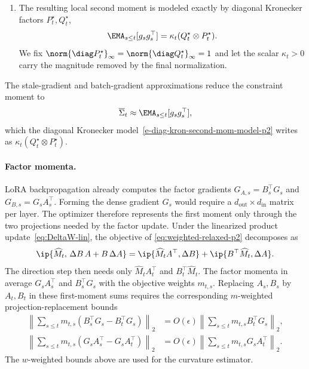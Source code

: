\begin{enumerate}[leftmargin=1.6em,itemsep=2pt,topsep=2pt]
  ; it measures the whole quadratic-form
  change, including the cross terms created by changing the factors.
  \item The resulting local second moment is modeled exactly by diagonal
  Kronecker factors $P^\star_t,Q^\star_t$,
  \begin{equation}\label{e-diag-kron-second-mom-model-p2}
    \EMA_{s\le t}[g_sg_s^\top]
    =
    \kappa_t(Q^\star_t\otimes P^\star_t).
  \end{equation}
  We fix $\norm{\diag P^\star_t}_\infty=\norm{\diag Q^\star_t}_\infty=1$ and
  let the scalar $\kappa_t>0$ carry the magnitude removed by the final
  normalization.
\end{enumerate}
The stale-gradient and batch-gradient approximations reduce the constraint
moment to
\[
  \overline\Sigma_t\approx\EMA_{s\le t}[g_sg_s^\top],
\]
which the diagonal Kronecker model~\eqref{e-diag-kron-second-mom-model-p2}
writes as $\kappa_t(Q^\star_t\otimes P^\star_t)$.

\paragraph{Factor momenta.}
LoRA backpropagation already computes the factor gradients
$G_{A,s}=B_s^\top G_s$ and $G_{B,s}=G_sA_s^\top$. Forming the dense
gradient $G_s$ would require a $d_{\mathrm{out}}\times d_{\mathrm{in}}$
matrix per layer. The optimizer therefore represents the first moment only
through the two projections needed by the factor update. Under the
linearized product update~\eqref{eq:DeltaW-lin}, the objective of
\eqref{eq:weighted-relaxed-p2} decomposes as
\[
  \ip{\widehat M_t,\,\Delta B\,A+B\,\Delta A}
  =
  \ip{\widehat M_tA^\top,\Delta B}
  +
  \ip{B^\top\widehat M_t,\Delta A}.
\]
The direction step then needs only $\widehat M_tA_t^\top$ and
$B_t^\top\widehat M_t$. The factor momenta in  average
$G_sA_s^\top$ and $B_s^\top G_s$ with the objective weights $m_{t,s}$.
Replacing $A_s,B_s$ by $A_t,B_t$ in these first-moment sums requires the
corresponding $m$-weighted projection-replacement bounds
\[
\begin{aligned}
  \left\|
    \sum_{s\le t}m_{t,s}(B_s^\top G_s-B_t^\top G_s)
  \right\|_2
  &=
  O(\epsilon)
  \left\|
    \sum_{s\le t}m_{t,s}B_t^\top G_s
  \right\|_2,\\
  \left\|
    \sum_{s\le t}m_{t,s}(G_sA_s^\top-G_sA_t^\top)
  \right\|_2
  &=
  O(\epsilon)
  \left\|
    \sum_{s\le t}m_{t,s}G_sA_t^\top
  \right\|_2 .
\end{aligned}
\]
The $w$-weighted bounds above are used for the curvature estimator.

